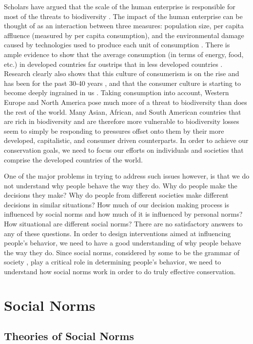 \documentclass[rutwik_proposal.tex]{subfiles}
\begin{document}
Scholars have argued that the scale of the human enterprise is responsible for most of the threats to biodiversity \cite{Ehrlich94}. The impact of the human enterprise can be thought of as an interaction between three measures: population size, per capita affluence (measured by per capita consumption), and the environmental damage caused by technologies used to produce each unit of consumption \cite{Ehrlich71}. There is ample evidence to show that the average consumption (in terms of energy, food, etc.) in developed countries far oustrips that in less developed countries \cite{UScons08, Lenzen99}. Research clearly also shows that this culture of consumerism is on the rise and has been for the past 30-40 years \cite{Schor99}, and that the consumer culture is starting to become deeply ingrained in us \cite{Schor04}. Taking consumption into account, Western Europe and North America pose much more of a threat to biodiversity than does the rest of the world. Many Asian, African, and South American countries that are rich in biodiversity and are therefore more vulnerable to biodiversity losses seem to simply be responding to pressures offset onto them by their more developed, capitalistic, and consumer driven counterparts. In order to achieve our conservation goals, we need to focus our efforts on individuals and societies that comprise the developed countries of the world.

One of the major problems in trying to address such issues however, is that we do not understand why people behave the way they do. Why do people make the decisions they make? Why do people from different societies make different decisions in similar situations? How much of our decision making process is influenced by social norms and how much of it is influenced by personal norms? How situational are different social norms? There are no satisfactory answers to any of these questions. In order to design interventions aimed at influencing people's behavior, we need to have a good understanding of why people behave the way they do. Since social norms, considered by some to be the grammar of society \cite{Bicchieri05}, play a critical role in determining people's behavior, we need to understand how social norms work in order to do truly effective conservation.

\section{Social Norms}\label{sec:norms}


\subsection{Theories of Social Norms}\label{subsec:theories}
\end{document}
